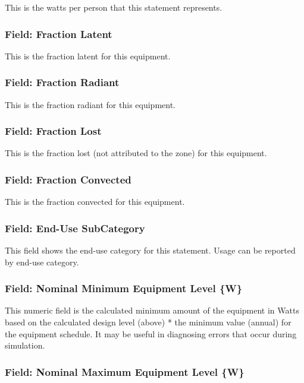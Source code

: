This is the watts per person that this statement represents.

\subsubsection{Field: Fraction Latent}\label{field-fraction-latent}

This is the fraction latent for this equipment.

\subsubsection{Field: Fraction Radiant}\label{field-fraction-radiant-2}

This is the fraction radiant for this equipment.

\subsubsection{Field: Fraction Lost}\label{field-fraction-lost}

This is the fraction lost (not attributed to the zone) for this equipment.

\subsubsection{Field: Fraction Convected}\label{field-fraction-convected-2}

This is the fraction convected for this equipment.

\subsubsection{Field: End-Use SubCategory}\label{field-end-use-subcategory}

This field shows the end-use category for this statement. Usage can be reported by end-use category.

\subsubsection{Field: Nominal Minimum Equipment Level \{W\}}\label{field-nominal-minimum-equipment-level-w}

This numeric field is the calculated minimum amount of the equipment in Watts based on the calculated design level (above) * the minimum value (annual) for the equipment schedule. It may be useful in diagnosing errors that occur during simulation.

\subsubsection{Field: Nominal Maximum Equipment Level \{W\}}\label{field-nominal-maximum-equipment-level-w}

